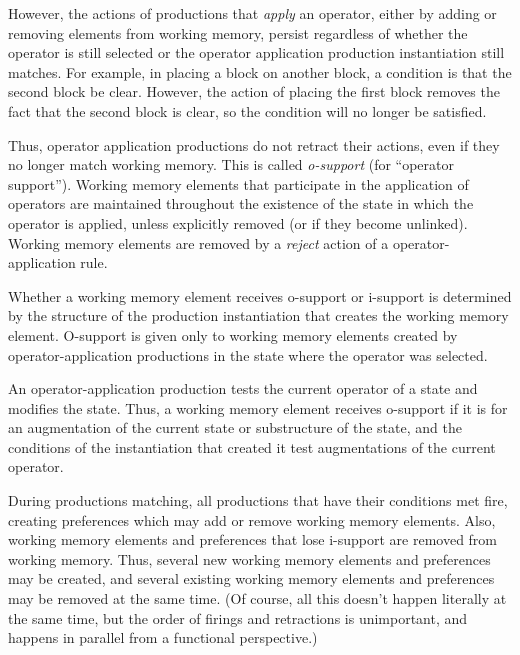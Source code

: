 However, the actions of productions that \emph{apply} an operator, either by adding or removing elements from working memory, persist regardless of whether the operator is still selected or the operator application  production instantiation still matches. For example, in placing a block on another block, a condition is that the second block be clear. However, the action of placing the first block removes the fact that the second block is clear, so the condition will no longer be satisfied.

Thus, operator application productions do not retract their actions, even if they no longer match working memory.  This is called \emph{o-support}  (for ``operator support''). Working memory elements that participate in the application of operators are maintained throughout the existence of the state in which the operator is applied, unless explicitly removed (or if they become unlinked).  Working memory elements are removed by a \emph{reject} action of a operator-application rule.  

Whether a working memory element receives o-support or i-support is determined by the structure of the production instantiation that creates the working memory element.  O-support is given only to working memory elements created by operator-application productions in the state where the operator was selected.

An operator-application production tests the current operator of a state and modifies the state. Thus, a working memory element receives o-support if it is for an augmentation of the current state or substructure of the state, and the conditions of the instantiation that created it test augmentations of the current operator.  

During productions matching, all productions that have their conditions met fire, creating preferences which may add or remove working memory elements.  Also, working memory elements and preferences that lose i-support are removed from working memory. Thus, several new working memory elements and preferences may be created, and several existing working memory elements and preferences may be removed at the same time. (Of course, all this doesn’t happen literally at the same time, but the order of firings and retractions is unimportant, and happens in parallel from a functional perspective.)

